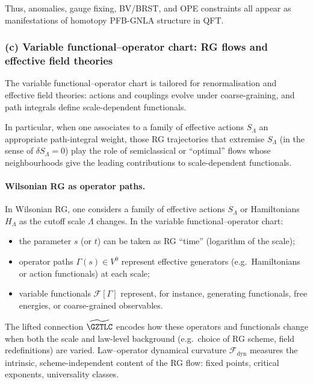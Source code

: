 \documentclass[11pt]{book}
\theoremstyle{plain}
\theoremstyle{definition}
\begin{document}
Thus, anomalies, gauge fixing, BV/BRST, and OPE constraints all appear
as manifestations of homotopy PFB-GNLA structure in QFT.



\subsubsection*{(c) Variable functional--operator chart: RG flows and effective field theories}

The variable functional--operator chart is tailored for renormalisation
and effective field theories: actions and couplings evolve under
coarse-graining, and path integrals define scale-dependent functionals.

In particular, when one associates to a family of effective actions
$S_\Lambda$ an appropriate path-integral weight, those RG trajectories
that extremise $S_\Lambda$ (in the sense of $\delta S_\Lambda=0$) play
the role of semiclassical or ``optimal'' flows whose neighbourhoods
give the leading contributions to scale-dependent functionals.


\paragraph{Wilsonian RG as operator paths.}

In Wilsonian RG, one considers a family of effective actions
$S_\Lambda$ or Hamiltonians $H_\Lambda$ as the cutoff scale $\Lambda$
changes. In the variable functional--operator chart:

\begin{itemize}
  \item the parameter $s$ (or $t$) can be taken as RG “time” (logarithm
        of the scale);
  \item operator paths
        $\Gamma(s)\in V^0$ represent effective generators (e.g.\
        Hamiltonians or action functionals) at each scale;
  \item variable functionals $\mathcal{F}[\Gamma]$ represent, for
        instance, generating functionals, free energies, or
        coarse-grained observables.
\end{itemize}

The lifted connection $\widetilde{\GZTLC}$ encodes how these operators
and functionals change when both the scale and law-level background
(e.g.\ choice of RG scheme, field redefinitions) are varied.
Law--operator dynamical curvature $\mathcal{F}_{\mathrm{dyn}}$ measures
the intrinsic, scheme-independent content of the RG flow: fixed points,
critical exponents, universality classes.
\end{document}
